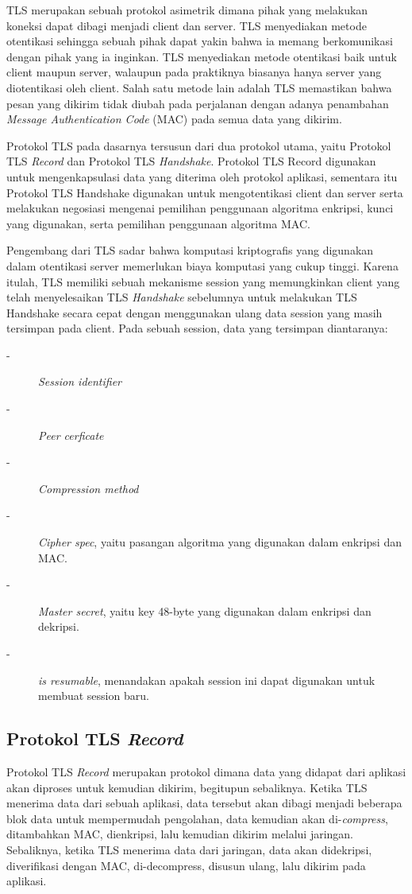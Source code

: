 TLS merupakan sebuah protokol asimetrik dimana pihak yang melakukan koneksi dapat dibagi menjadi client dan server. TLS menyediakan metode otentikasi sehingga sebuah pihak dapat yakin bahwa ia memang berkomunikasi dengan pihak yang ia inginkan. TLS menyediakan metode otentikasi baik untuk client maupun server, walaupun pada praktiknya biasanya hanya server yang diotentikasi oleh client. Salah satu metode lain adalah TLS memastikan bahwa pesan yang dikirim tidak diubah pada perjalanan dengan adanya penambahan \textit{Message Authentication Code} (MAC) pada semua data yang dikirim.

Protokol TLS pada dasarnya tersusun dari dua protokol utama, yaitu Protokol TLS \textit{Record} dan Protokol TLS \textit{Handshake}. Protokol TLS Record digunakan untuk mengenkapsulasi data yang diterima oleh protokol aplikasi, sementara itu Protokol TLS Handshake digunakan untuk mengotentikasi client dan server serta melakukan negosiasi mengenai pemilihan penggunaan algoritma enkripsi, kunci yang digunakan, serta pemilihan penggunaan algoritma MAC.

Pengembang dari TLS sadar bahwa komputasi kriptografis yang digunakan dalam otentikasi server memerlukan biaya komputasi yang cukup tinggi. Karena itulah, TLS memiliki sebuah mekanisme session yang memungkinkan client yang telah menyelesaikan TLS \textit{Handshake} sebelumnya untuk melakukan TLS Handshake secara cepat dengan menggunakan ulang data session yang masih tersimpan pada client. Pada sebuah session, data yang tersimpan diantaranya:
\begin{description}
  \item[-] \textit{Session identifier}
  \item[-] \textit{Peer cerficate}
  \item[-] \textit{Compression method}
  \item[-] \textit{Cipher spec}, yaitu pasangan algoritma yang digunakan dalam enkripsi dan MAC.
  \item[-] \textit{Master secret}, yaitu key 48-byte yang digunakan dalam enkripsi dan dekripsi.
  \item[-] \textit{is resumable}, menandakan apakah session ini dapat digunakan untuk membuat session baru.
\end{description}


\subsection{Protokol TLS \textit{Record}}
Protokol TLS \textit{Record} merupakan protokol dimana data yang didapat dari aplikasi akan diproses untuk kemudian dikirim, begitupun sebaliknya. Ketika TLS menerima data dari sebuah aplikasi, data tersebut akan dibagi menjadi beberapa blok data untuk mempermudah pengolahan, data kemudian akan di-\textit{compress}, ditambahkan MAC, dienkripsi, lalu kemudian dikirim melalui jaringan. Sebaliknya, ketika TLS menerima data dari jaringan, data akan didekripsi, diverifikasi dengan MAC, di-decompress, disusun ulang, lalu dikirim pada aplikasi.

